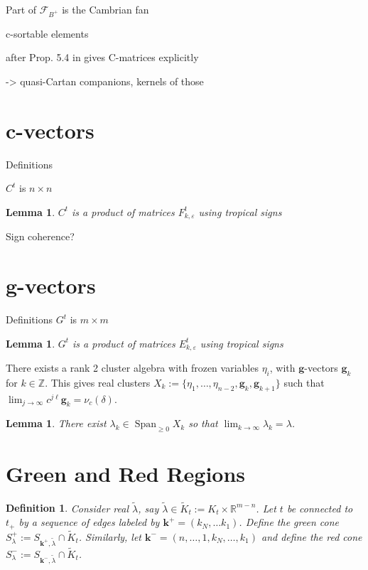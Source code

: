 \documentclass{amsart}
\newtheorem{definition}[theorem]{Definition}
\newtheorem{lemma}[theorem]{Lemma}
\numberwithin{theorem}{section}
\newcommand{\bfc}{\boldsymbol{c}}
\newcommand{\bfg}{\boldsymbol{g}}
\newcommand{\bfk}{{\boldsymbol{k}}}
\newcommand{\cF}{\mathcal{F}}
\newcommand{\RR}{\mathbb{R}}
\newcommand{\ZZ}{\mathbb{Z}}
\newcommand{\Span}{{\operatorname{Span}}}
\begin{document}
  Part of $\cF_{B^+}$ is the Cambrian fan
  
  c-sortable elements
  
  after Prop. 5.4 in \cite{combinatorial frameworks} gives C-matrices explicitly
  
  -> quasi-Cartan companions, kernels of those



  \section{$\bfc$-vectors}

  Definitions

  $C^t$ is $n\times n$
  \begin{lemma}
    $C^t$ is a product of matrices $F^t_{k,\varepsilon}$ using tropical signs
  \end{lemma}

  Sign coherence?



  \section{$\bfg$-vectors}
  Definitions $G^t$ is $m\times m$
  \begin{lemma}
    $G^t$ is a product of matrices $E^t_{k,\varepsilon}$ using tropical signs
  \end{lemma}

  There exists a rank 2 cluster algebra with frozen variables $\eta_i$, with $\bfg$-vectors $\bfg_k$ for $k\in\ZZ$.
  This gives real clusters $X_k:=\{\eta_1,\ldots,\eta_{n-2},\bfg_k,\bfg_{k+1}\}$ such that $\lim_{j\to\infty} c^{j\ell}\bfg_k=\nu_c(\delta)$.

  \begin{lemma}
    There exist $\lambda_k\in\Span_{\ge0} X_k$ so that $\lim_{k\to\infty} \lambda_k=\lambda$.
  \end{lemma}


  \section{Green and Red Regions}

  \begin{definition}
    Consider real $\tilde \lambda$, say $\tilde \lambda\in \tilde K_t:= K_t\times \RR^{m-n}$.
    Let $t$ be connected to $t_+$ by a sequence of edges labeled by $\bfk^+=(k_N,\ldots k_1)$. 
    Define the \emph{green cone} $S_\lambda^+:=S_{\bfk^+,\tilde\lambda}\cap\tilde K_t$.
    Similarly, let $\bfk^-=(n,\ldots,1,k_N,\ldots,k_1)$ and define the \emph{red cone} $S_\lambda^-:=S_{\bfk^-,\tilde\lambda}\cap\tilde K_t$.
  \end{definition}
\end{document}
